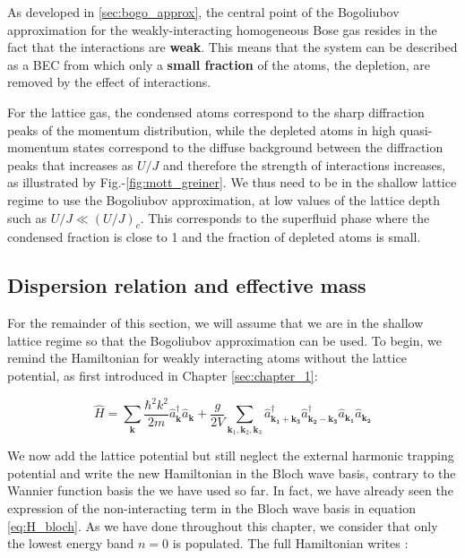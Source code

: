 As developed in \ref{sec:bogo_approx}, the central point of the Bogoliubov approximation for the weakly-interacting homogeneous Bose gas resides in the fact that the interactions are \textbf{weak}. This means that the system can be described as a BEC from which only a \textbf{small fraction} of the atoms, the depletion, are removed by the effect of interactions.

For the lattice gas, the condensed atoms correspond to the sharp diffraction peaks of the momentum distribution, while the depleted atoms in high quasi-momentum states correspond to the diffuse background between the diffraction peaks that increases as $U/J$ and therefore the strength of interactions increases, as illustrated by Fig.-\ref{fig:mott_greiner}. We thus need to be in the shallow lattice regime to use the Bogoliubov approximation, \ie at low values of the lattice depth such as $U/J \ll (U/J)_c$. This corresponds to the superfluid phase where the condensed fraction is close to 1 and the fraction of depleted atoms is small.


\subsection{Dispersion relation and effective mass}

For the remainder of this section, we will assume that we are in the shallow lattice regime so that the Bogoliubov approximation can be used. To begin, we remind the Hamiltonian for weakly interacting atoms without the lattice potential, as first introduced in Chapter \ref{sec:chapter_1}:

\begin{equation}
    \hat{H}=\sum_{\bm{k}}\frac{\hbar^2 k^2}{2m} \hat{a}^{\dagger}_{\bm{k}}  \hat{a}_{\bm{k}} +  \frac{g}{2V} \sum_{\bm{k}_1,\bm{k}_2,\bm{k}_3} \hat{a}^{\dagger}_{\bm{k_1}+\bm{k_3}} \hat{a}^{\dagger}_{\bm{k_2}-\bm{k_3}} \hat{a}_{\bm{k_1}} \hat{a}_{\bm{k_2}} 
\end{equation}

We now add the lattice potential but still neglect the external harmonic trapping potential and write the new Hamiltonian in the Bloch wave basis, contrary to the Wannier function basis the we have used so far. In fact, we have already seen the expression of the non-interacting term in the Bloch wave basis in equation \ref{eq:H_bloch}. As we have done throughout this chapter, we consider that only the lowest energy band $n=0$ is populated. The full Hamiltonian writes \cite{dalibard2013cages}:

